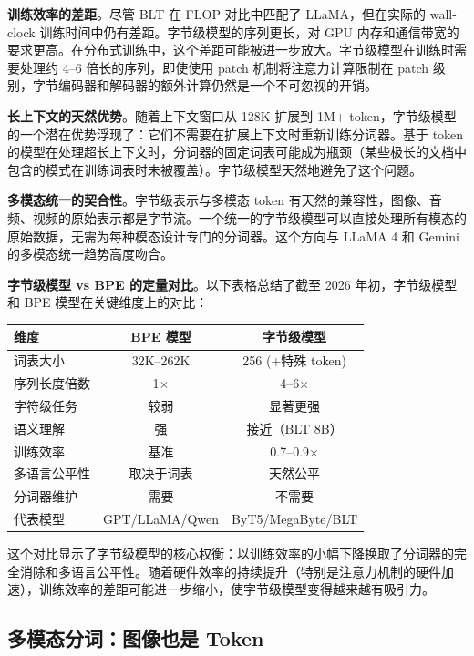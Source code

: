 \textbf{训练效率的差距}。尽管 BLT 在 FLOP 对比中匹配了 LLaMA，但在实际的 wall-clock 训练时间中仍有差距。字节级模型的序列更长，对 GPU 内存和通信带宽的要求更高。在分布式训练中，这个差距可能被进一步放大。字节级模型在训练时需要处理约 4--6 倍长的序列，即使使用 patch 机制将注意力计算限制在 patch 级别，字节编码器和解码器的额外计算仍然是一个不可忽视的开销。

\textbf{长上下文的天然优势}。随着上下文窗口从 128K 扩展到 1M+ token，字节级模型的一个潜在优势浮现了：它们不需要在扩展上下文时重新训练分词器。基于 token 的模型在处理超长上下文时，分词器的固定词表可能成为瓶颈（某些极长的文档中包含的模式在训练词表时未被覆盖）。字节级模型天然地避免了这个问题。

\textbf{多模态统一的契合性}。字节级表示与多模态 token 有天然的兼容性，图像、音频、视频的原始表示都是字节流。一个统一的字节级模型可以直接处理所有模态的原始数据，无需为每种模态设计专门的分词器。这个方向与 LLaMA 4 和 Gemini 的多模态统一趋势高度吻合。

\textbf{字节级模型 vs BPE 的定量对比}。以下表格总结了截至 2026 年初，字节级模型和 BPE 模型在关键维度上的对比：

\begin{center}\small
\renewcommand{\arraystretch}{1.3}
\begin{tabular}{lcc}
\toprule
\rowcolor{figLightGray}
\textbf{维度} & \textbf{BPE 模型} & \textbf{字节级模型} \\
\midrule
词表大小       & 32K--262K     & 256 (+特殊 token) \\
序列长度倍数   & 1$\times$     & 4--6$\times$ \\
字符级任务     & 较弱           & 显著更强 \\
语义理解       & 强             & 接近（BLT 8B） \\
训练效率       & 基准           & 0.7--0.9$\times$ \\
多语言公平性   & 取决于词表     & 天然公平 \\
分词器维护     & 需要           & 不需要 \\
代表模型       & GPT/LLaMA/Qwen & ByT5/MegaByte/BLT \\
\bottomrule
\end{tabular}
\end{center}

这个对比显示了字节级模型的核心权衡：以训练效率的小幅下降换取了分词器的完全消除和多语言公平性。随着硬件效率的持续提升（特别是注意力机制的硬件加速），训练效率的差距可能进一步缩小，使字节级模型变得越来越有吸引力。

\subsection{多模态分词：图像也是 Token}

